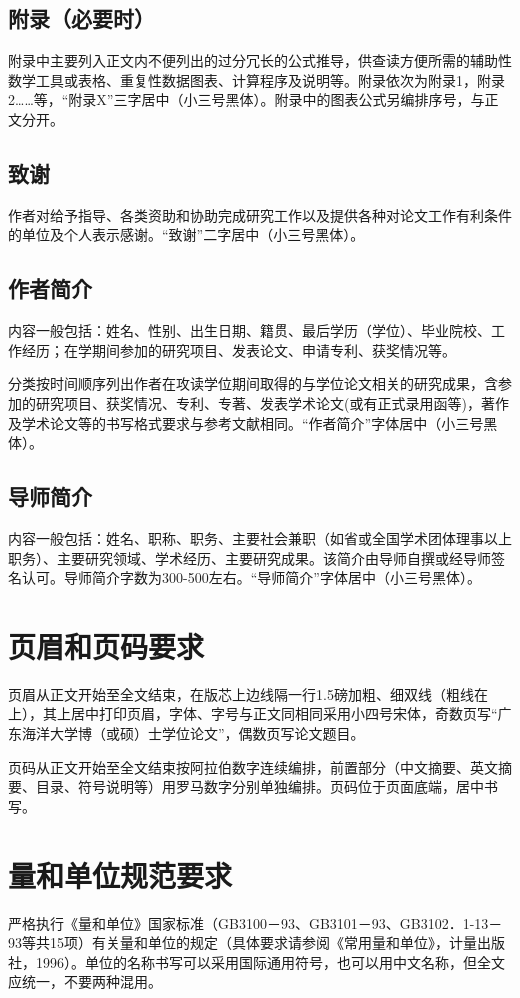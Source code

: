 \subsection{附录（必要时）}
附录中主要列入正文内不便列出的过分冗长的公式推导，供查读方便所需的辅助性数学工具或表格、重复性数据图表、计算程序及说明等。附录依次为附录1，附录2……等，“附录X”三字居中（小三号黑体）。附录中的图表公式另编排序号，与正文分开。
\subsection{致谢}
作者对给予指导、各类资助和协助完成研究工作以及提供各种对论文工作有利条件的单位及个人表示感谢。“致谢”二字居中（小三号黑体）。
\subsection{作者简介}
内容一般包括：姓名、性别、出生日期、籍贯、最后学历（学位）、毕业院校、工作经历；在学期间参加的研究项目、发表论文、申请专利、获奖情况等。

分类按时间顺序列出作者在攻读学位期间取得的与学位论文相关的研究成果，含参加的研究项目、获奖情况、专利、专著、发表学术论文(或有正式录用函等)，著作及学术论文等的书写格式要求与参考文献相同。“作者简介”字体居中（小三号黑体）。
\subsection{导师简介}
内容一般包括：姓名、职称、职务、主要社会兼职（如省或全国学术团体理事以上职务）、主要研究领域、学术经历、主要研究成果。该简介由导师自撰或经导师签名认可。导师简介字数为300-500左右。“导师简介”字体居中（小三号黑体）。
\section{页眉和页码要求}
页眉从正文开始至全文结束，在版芯上边线隔一行1.5磅加粗、细双线（粗线在上），其上居中打印页眉，字体、字号与正文同相同采用小四号宋体，奇数页写“广东海洋大学博（或硕）士学位论文”，偶数页写论文题目。

页码从正文开始至全文结束按阿拉伯数字连续编排，前置部分（中文摘要、英文摘要、目录、符号说明等）用罗马数字分别单独编排。页码位于页面底端，居中书写。

\section{量和单位规范要求}
严格执行《量和单位》国家标准（GB3100－93、GB3101－93、GB3102．1-13－93等共15项）有关量和单位的规定（具体要求请参阅《常用量和单位》，计量出版社，1996）。单位的名称书写可以采用国际通用符号，也可以用中文名称，但全文应统一，不要两种混用。
